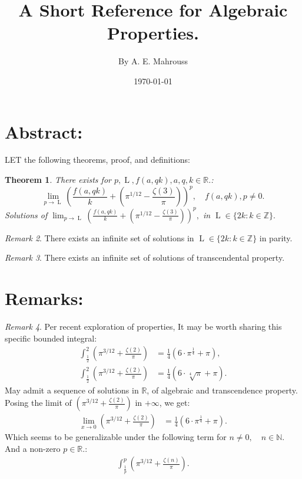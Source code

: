 \documentclass[10pt]{article}
\title{%
	\vspace{-1.5em}%
	\large\textbf{A Short Reference for Algebraic Properties.}%
}
\author{By A. E. Mahrouss}
\date{\today}
\theoremstyle{plain}
\newtheorem{theorem}{Theorem}[section]
\theoremstyle{definition}
\theoremstyle{remark}
\newtheorem{remark}[theorem]{Remark}
\begin{document}

\maketitle
\tableofcontents
\newpage

\section{Abstract:}

\lettrine[lines=1, lhang=0.1, loversize=0.2]{L}ET the following theorems, proof, and definitions:

\begin{theorem}
	There exists for $p, \operatorname{L}, f(a, qk), a, q, k \in \mathbb{R}.$:
	\begin{equation}
		\lim_{p \to \operatorname{L}} (\frac{f(a, qk)}{k} + (\pi^{1/12} - \frac{\zeta(3)}{\pi}))^p, \quad f(a, qk), p \neq 0.
	\end{equation}
	Solutions of $\lim_{p \to \operatorname{L}} (\frac{f(a, qk)}{k} + (\pi^{1/12} - \frac{\zeta(3)}{\pi}))^p,$ in  $\operatorname{L} \in \{2k : k \in \mathbb{Z}\}.$
\end{theorem}
\begin{remark}
	There exists an infinite set of solutions in $\operatorname{L} \in \{2k : k \in \mathbb{Z}\}$ in parity.
\end{remark}
\begin{remark}
There exists an infinite set of solutions of transcendental property.
\end{remark}

\section{Remarks:}

\begin{remark}
	Per recent exploration of properties, It may be worth sharing this specific bounded integral:
	\begin{align*}
		\int_{\frac{1}{2}}^{2} (\pi^{3/12} + \frac{\zeta(2)}{\pi}) &= \frac{1}{4} (6 \cdot \pi^{\frac{1}{4}} + \pi),\\
		\int_{\frac{1}{2}}^{2} (\pi^{3/12} + \frac{\zeta(2)}{\pi}) &= \frac{1}{4} (6 \cdot \sqrt[4]{\pi} + \pi).
	\end{align*}
	May admit a sequence of solutions in $\mathbb{R}$, of algebraic and transcendence property. Posing the limit of $(\pi^{3/12} + \frac{\zeta(2)}{\pi})$ in $+\infty$, we get:
	\begin{align*}
	\lim_{x \to 0} (\pi^{3/12} + \frac{\zeta(2)}{\pi}) &= \frac{1}{4} (6 \cdot \pi^{\frac{1}{4}} + \pi).
	\end{align*}
	Which seems to be generalizable under the following term for $n \neq 0, \quad n \in \mathbb{N}.$ And a non-zero $p \in \mathbb{R}.$:
	\begin{align*}
		\int_{\frac{1}{p}}^{p} (\pi^{3/12} + \frac{\zeta(n)}{\pi}).
	\end{align*}
\end{remark}
\end{document}
